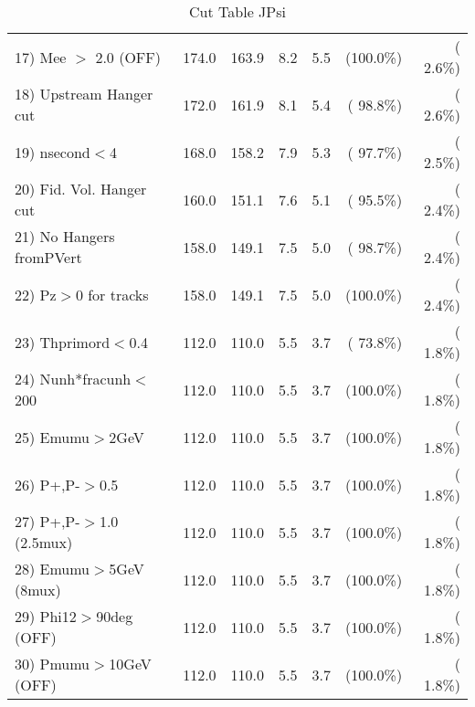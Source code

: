 \begin{table}[h!]
\begin{tabular}{||l||r|r|r|r|r|r||}
 17) Mee $>$ 2.0  (OFF)   &        174.0 &        163.9 &          8.2 &          5.5 & (100.0\%) & (  2.6\%) \\
 18) Upstream Hanger cut  &        172.0 &        161.9 &          8.1 &          5.4 & ( 98.8\%) & (  2.6\%) \\
 19) nsecond$<$4          &        168.0 &        158.2 &          7.9 &          5.3 & ( 97.7\%) & (  2.5\%) \\
 20) Fid. Vol. Hanger cut &        160.0 &        151.1 &          7.6 &          5.1 & ( 95.5\%) & (  2.4\%) \\
 21) No Hangers fromPVert &        158.0 &        149.1 &          7.5 &          5.0 & ( 98.7\%) & (  2.4\%) \\
 22) Pz$>$0 for tracks    &        158.0 &        149.1 &          7.5 &          5.0 & (100.0\%) & (  2.4\%) \\
 23) Thprimord$<$0.4      &        112.0 &        110.0 &          5.5 &          3.7 & ( 73.8\%) & (  1.8\%) \\
 24) Nunh*fracunh$<$200   &        112.0 &        110.0 &          5.5 &          3.7 & (100.0\%) & (  1.8\%) \\
 25) Emumu$>$2GeV         &        112.0 &        110.0 &          5.5 &          3.7 & (100.0\%) & (  1.8\%) \\
 26) P+,P-$>$0.5          &        112.0 &        110.0 &          5.5 &          3.7 & (100.0\%) & (  1.8\%) \\
 27) P+,P-$>$1.0 (2.5mux) &        112.0 &        110.0 &          5.5 &          3.7 & (100.0\%) & (  1.8\%) \\
 28) Emumu$>$5GeV  (8mux) &        112.0 &        110.0 &          5.5 &          3.7 & (100.0\%) & (  1.8\%) \\
 29) Phi12$>$90deg  (OFF) &        112.0 &        110.0 &          5.5 &          3.7 & (100.0\%) & (  1.8\%) \\
 30) Pmumu$>$10GeV  (OFF) &        112.0 &        110.0 &          5.5 &          3.7 & (100.0\%) & (  1.8\%) \\
 \hline
 \hline
 \end{tabular}
 \caption{Cut Table  JPsi     }
 \label{tab-cutcohjpsi-mumu_cohrhop}
 \end{table}
